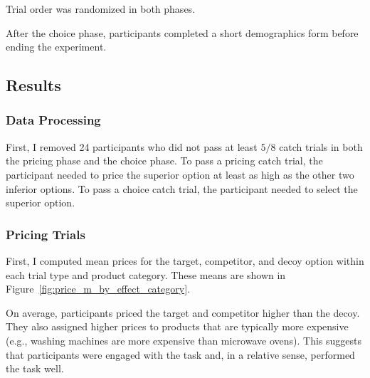 Trial order was randomized in both phases.

After the choice phase, participants completed a short demographics form before ending the experiment.

\subsection{Results}

\subsubsection{Data Processing}

First, I removed 24 participants who did not pass at least $5/8$ catch trials in both the pricing phase and the choice phase. To pass a pricing catch trial, the participant needed to price the superior option at least as high as the other two inferior options. To pass a choice catch trial, the participant needed to select the superior option. 

\subsubsection{Pricing Trials}

First, I computed mean prices for the target, competitor, and decoy option within each trial type and product category. These means are shown in Figure~\ref{fig:price_m_by_effect_category}.

On average, participants priced the target and competitor higher than the decoy. They also assigned higher prices to products that are typically more expensive (e.g., washing machines are more expensive than microwave ovens). This suggests that participants were engaged with the task and, in a relative sense, performed the task well.

